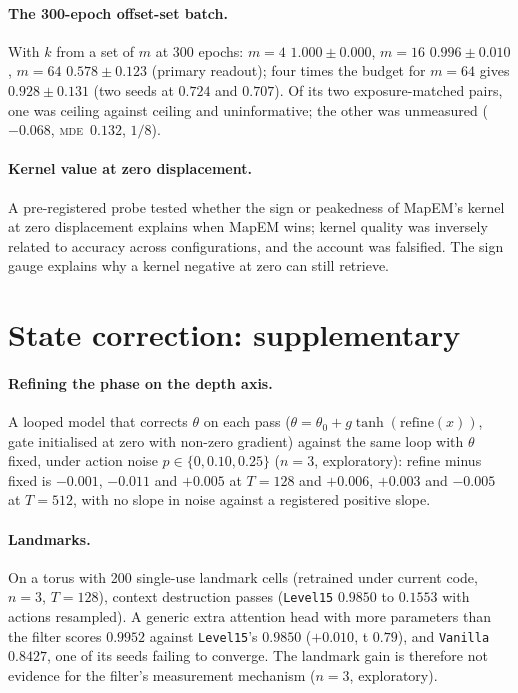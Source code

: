 \documentclass[10pt]{article}
\newcommand{\mde}{\textsc{mde}}
\newcommand{\arm}[1]{\texttt{#1}}
\begin{document}
\paragraph{The 300-epoch offset-set batch.} With $k$ from a set of $m$ at 300 epochs: $m=4$ $1.000\pm0.000$, $m=16$
$0.996\pm0.010$, $m=64$ $0.578\pm0.123$ (primary readout); four times the budget for $m=64$ gives $0.928\pm0.131$ (two seeds at
$0.724$ and $0.707$). Of its two exposure-matched pairs, one was ceiling against ceiling and uninformative; the other was
unmeasured ($-0.068$, \mde\ $0.132$, $1/8$). %

\paragraph{Kernel value at zero displacement.} A pre-registered probe tested whether the sign or peakedness of
MapEM's kernel at zero displacement explains when MapEM wins; kernel quality was inversely related to accuracy
across configurations, and the account was falsified. The sign gauge explains why a kernel negative at zero can
still retrieve. %

\section{State correction: supplementary}
\label{app:correction}

\paragraph{Refining the phase on the depth axis.} A looped model that corrects $\theta$ on each pass
($\theta=\theta_0+g\tanh(\mathrm{refine}(x))$, gate initialised at zero with non-zero gradient) against the same
loop with $\theta$ fixed, under action noise $p\in\{0,0.10,0.25\}$ ($n=3$, exploratory): refine minus fixed is $-0.001$,
$-0.011$ and $+0.005$ at $T=128$ and $+0.006$, $+0.003$ and $-0.005$ at $T=512$, with no slope in noise against
a registered positive slope. %

\paragraph{Landmarks.} On a torus with 200 single-use landmark cells (retrained under current code, $n=3$,
$T=128$), context destruction passes (\arm{Level15} $0.9850$ to $0.1553$ with actions resampled). A generic extra
attention head with more parameters than the filter scores $0.9952$ against \arm{Level15}'s $0.9850$ ($+0.010$, t
$0.79$), and \arm{Vanilla} $0.8427$, one of its seeds failing to converge. The landmark gain is therefore not
evidence for the filter's measurement mechanism ($n=3$, exploratory). %
\end{document}
